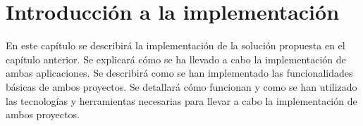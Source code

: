 \section{Introducción a la implementación}
\label{sec:introduccion_implementacion}

En este capítulo se describirá la implementación de la solución propuesta en el capítulo anterior. Se explicará cómo se
ha llevado a cabo la implementación de ambas aplicaciones. Se describirá como se han implementado las funcionalidades básicas
de ambos proyectos. Se detallará cómo funcionan y como se han utilizado las tecnologías y herramientas necesarias para
llevar a cabo la implementación de ambos proyectos. 

